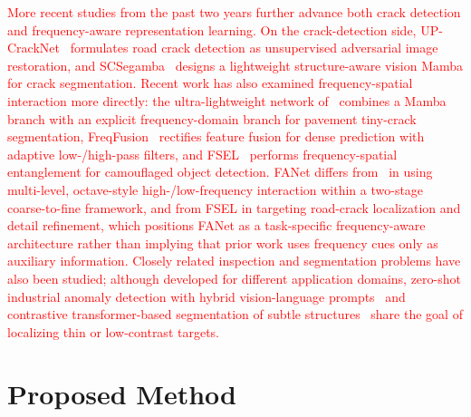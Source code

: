 \documentclass[journal]{IEEEtran}
\begin{document}
\textcolor{red}{More recent studies from the past two years further advance both crack detection and frequency-aware representation learning. On the crack-detection side, UP-CrackNet~\cite{TITS24_UPCrackNet} formulates road crack detection as unsupervised adversarial image restoration, and SCSegamba~\cite{CVPR25_SCSegamba} designs a lightweight structure-aware vision Mamba for crack segmentation. Recent work has also examined frequency-spatial interaction more directly: the ultra-lightweight network of~\cite{ESWA25_MambaFreqCrack} combines a Mamba branch with an explicit frequency-domain branch for pavement tiny-crack segmentation, FreqFusion~\cite{TPAMI24_FreqFusion} rectifies feature fusion for dense prediction with adaptive low-/high-pass filters, and FSEL~\cite{ECCV24_FSEL} performs frequency-spatial entanglement for camouflaged object detection. FANet differs from~\cite{ESWA25_MambaFreqCrack} in using multi-level, octave-style high-/low-frequency interaction within a two-stage coarse-to-fine framework, and from FSEL in targeting road-crack localization and detail refinement, which positions FANet as a task-specific frequency-aware architecture rather than implying that prior work uses frequency cues only as auxiliary information. Closely related inspection and segmentation problems have also been studied; although developed for different application domains, zero-shot industrial anomaly detection with hybrid vision-language prompts~\cite{TCYB25_AnomalyVLM} and contrastive transformer-based segmentation of subtle structures~\cite{TCYB24_CTNet} share the goal of localizing thin or low-contrast targets.}





\section{Proposed Method}
\end{document}
